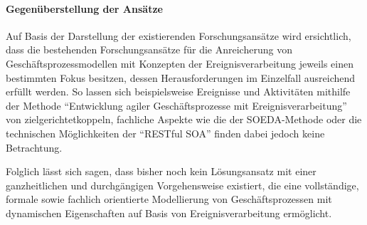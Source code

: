 \paragraph{Gegenüberstellung der Ansätze}
Auf Basis der Darstellung der existierenden Forschungsansätze wird ersichtlich, dass die bestehenden Forschungsansätze für die Anreicherung von Geschäftsprozessmodellen mit Konzepten der Ereignisverarbeitung jeweils einen bestimmten Fokus besitzen, dessen Herausforderungen im Einzelfall ausreichend erfüllt werden. 
So lassen sich beispielsweise Ereignisse und Aktivitäten mithilfe der Methode \enquote{Entwicklung agiler Geschäftsprozesse mit Ereignisverarbeitung} von \citeauthor{Alexopoulou.2008} zielgerichtetkoppeln, fachliche Aspekte wie die der SOEDA-Methode oder die technischen Möglichkeiten der \enquote{RESTful SOA} finden dabei jedoch keine Betrachtung. 

Folglich lässt sich sagen, dass bisher noch kein Lösungsansatz mit einer ganzheitlichen und durchgängigen Vorgehensweise existiert, die eine vollständige, formale sowie fachlich orientierte Modellierung von Geschäftsprozessen mit dynamischen Eigenschaften auf Basis von Ereignisverarbeitung ermöglicht.

